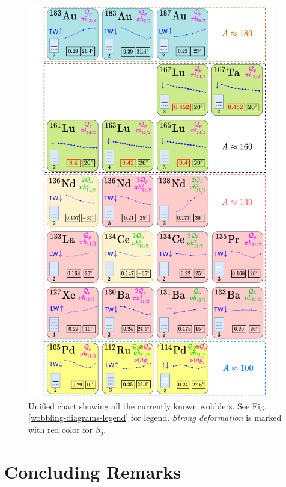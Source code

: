 \begin{figure}
    \centering
    \includegraphics[width=0.96\textwidth]{Chapters/Figures/wobblers-chart.pdf}
    \caption{Unified chart showing all the currently known wobblers. See Fig. \ref{wobbling-diagrams-legend} for legend. \emph{Strong deformation} is marked with red color for $\beta_2$.}
    \label{wobbling-diagram-chart}
\end{figure}

\section{Concluding Remarks}
\label{c5-concluding-remarks}

